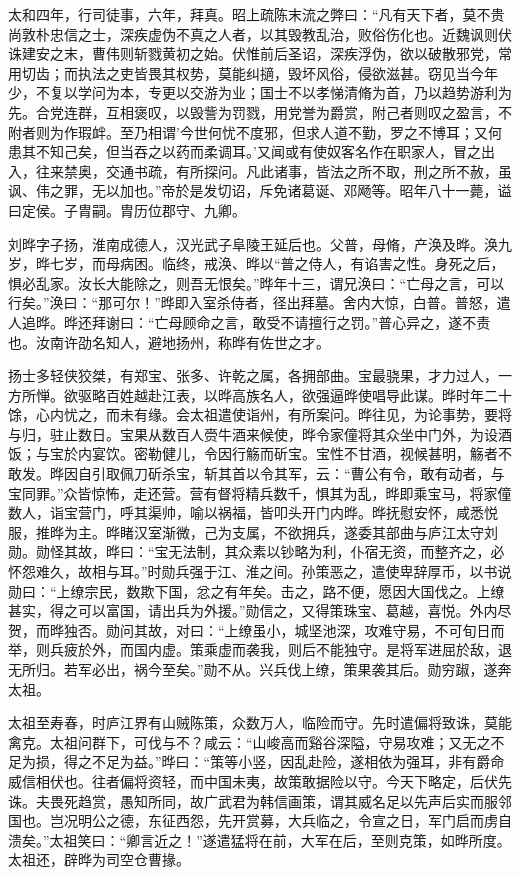 \documentclass[12pt,UTF8]{ctexbook}
\begin{document}
太和四年，行司徒事，六年，拜真。昭上疏陈末流之弊曰：“凡有天下者，莫不贵尚敦朴忠信之士，深疾虚伪不真之人者，以其毁教乱治，败俗伤化也。近魏讽则伏诛建安之末，曹伟则斩戮黄初之始。伏惟前后圣诏，深疾浮伪，欲以破散邪党，常用切齿；而执法之吏皆畏其权势，莫能纠擿，毁坏风俗，侵欲滋甚。窃见当今年少，不复以学问为本，专更以交游为业；国士不以孝悌清脩为首，乃以趋势游利为先。合党连群，互相褒叹，以毁訾为罚戮，用党誉为爵赏，附己者则叹之盈言，不附者则为作瑕衅。至乃相谓'今世何忧不度邪，但求人道不勤，罗之不博耳；又何患其不知己矣，但当吞之以药而柔调耳。'又闻或有使奴客名作在职家人，冒之出入，往来禁奥，交通书疏，有所探问。凡此诸事，皆法之所不取，刑之所不赦，虽讽、伟之罪，无以加也。”帝於是发切诏，斥免诸葛诞、邓飏等。昭年八十一薨，谥曰定侯。子胄嗣。胄历位郡守、九卿。

刘晔字子扬，淮南成德人，汉光武子阜陵王延后也。父普，母脩，产涣及晔。涣九岁，晔七岁，而母病困。临终，戒涣、晔以“普之侍人，有谄害之性。身死之后，惧必乱家。汝长大能除之，则吾无恨矣。”晔年十三，谓兄涣曰：“亡母之言，可以行矣。”涣曰：“那可尔！”晔即入室杀侍者，径出拜墓。舍内大惊，白普。普怒，遣人追晔。晔还拜谢曰：“亡母顾命之言，敢受不请擅行之罚。”普心异之，遂不责也。汝南许劭名知人，避地扬州，称晔有佐世之才。

扬士多轻侠狡桀，有郑宝、张多、许乾之属，各拥部曲。宝最骁果，才力过人，一方所惮。欲驱略百姓越赴江表，以晔高族名人，欲强逼晔使唱导此谋。晔时年二十馀，心内忧之，而未有缘。会太祖遣使诣州，有所案问。晔往见，为论事势，要将与归，驻止数日。宝果从数百人赍牛酒来候使，晔令家僮将其众坐中门外，为设酒饭；与宝於内宴饮。密勒健儿，令因行觞而斫宝。宝性不甘酒，视候甚明，觞者不敢发。晔因自引取佩刀斫杀宝，斩其首以令其军，云：“曹公有令，敢有动者，与宝同罪。”众皆惊怖，走还营。营有督将精兵数千，惧其为乱，晔即乘宝马，将家僮数人，诣宝营门，呼其渠帅，喻以祸福，皆叩头开门内晔。晔抚慰安怀，咸悉悦服，推晔为主。晔睹汉室渐微，己为支属，不欲拥兵，遂委其部曲与庐江太守刘勋。勋怪其故，晔曰：“宝无法制，其众素以钞略为利，仆宿无资，而整齐之，必怀怨难久，故相与耳。”时勋兵强于江、淮之间。孙策恶之，遣使卑辞厚币，以书说勋曰：“上缭宗民，数欺下国，忿之有年矣。击之，路不便，愿因大国伐之。上缭甚实，得之可以富国，请出兵为外援。”勋信之，又得策珠宝、葛越，喜悦。外内尽贺，而晔独否。勋问其故，对曰：“上缭虽小，城坚池深，攻难守易，不可旬日而举，则兵疲於外，而国内虚。策乘虚而袭我，则后不能独守。是将军进屈於敌，退无所归。若军必出，祸今至矣。”勋不从。兴兵伐上缭，策果袭其后。勋穷踧，遂奔太祖。

太祖至寿春，时庐江界有山贼陈策，众数万人，临险而守。先时遣偏将致诛，莫能禽克。太祖问群下，可伐与不？咸云：“山峻高而谿谷深隘，守易攻难；又无之不足为损，得之不足为益。”晔曰：“策等小竖，因乱赴险，遂相依为强耳，非有爵命威信相伏也。往者偏将资轻，而中国未夷，故策敢据险以守。今天下略定，后伏先诛。夫畏死趋赏，愚知所同，故广武君为韩信画策，谓其威名足以先声后实而服邻国也。岂况明公之德，东征西怨，先开赏募，大兵临之，令宣之日，军门启而虏自溃矣。”太祖笑曰：“卿言近之！”遂遣猛将在前，大军在后，至则克策，如晔所度。太祖还，辟晔为司空仓曹掾。
\end{document}

